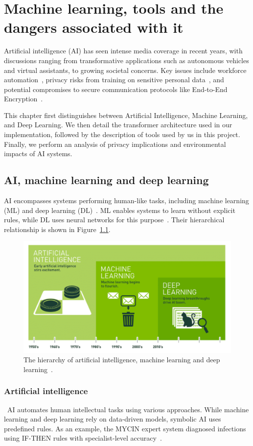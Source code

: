 \documentclass[licencjacka,en]{pracamgr}
\begin{document}
\chapter{Machine learning, tools and the dangers associated with it} \label{chap:machine_learning}

Artificial intelligence (AI) has seen intense media coverage in recent years, with discussions ranging from transformative applications such as autonomous vehicles and virtual assistants, to growing societal concerns. Key issues include workforce automation~\cite{francuz_1}, privacy risks from training on sensitive personal data~\cite{ibm_privacy}, and potential compromises to secure communication protocols like End-to-End Encryption~\cite{E2EE}.

This chapter first distinguishes between Artificial Intelligence, Machine Learning, and Deep Learning. We then detail the transformer architecture used in our implementation, followed by the description of tools used by us in this project. Finally, we perform an analysis of privacy implications and environmental impacts of AI systems.

\section{AI, machine learning and deep learning}
AI encompasses systems performing human-like tasks, including machine learning (ML) and deep learning (DL)~\cite{ibm_ai,francuz_2}. ML enables systems to learn without explicit rules, while DL uses neural networks for this purpose~\cite{ibm_ai}. Their hierarchical relationship is shown in Figure~\ref{fig:hierarchy-ai-ml-dl}.

\begin{figure}
    \centering
    \includegraphics[width=0.5\linewidth]{bachelor_images/nvidia_ai_hierarchy.png}
    \caption{The hierarchy of artificial intelligence, machine learning and deep learning~\cite{nvidiaimage}.}
    \label{fig:hierarchy-ai-ml-dl}
\end{figure}

\subsection{Artificial intelligence} \
AI automates human intellectual tasks using various approaches. While machine learning and deep learning rely on data-driven models, symbolic AI uses predefined rules. As an example, the MYCIN expert system diagnosed infections using IF-THEN rules with specialist-level accuracy~\cite{francuz_2, mycin}.
\end{document}
